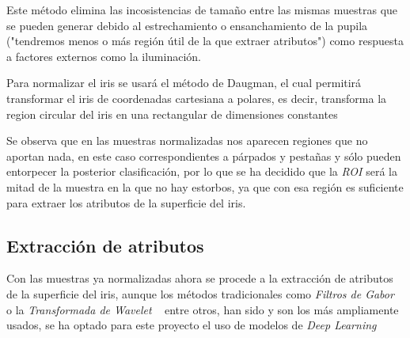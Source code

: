 Este método elimina las incosistencias de tamaño entre las mismas muestras que se pueden generar debido al estrechamiento o ensanchamiento de la pupila ("tendremos menos o más región útil de la que extraer atributos") como respuesta a factores externos como la iluminación.

Para normalizar el iris se usará el método de Daugman, el cual permitirá transformar el iris de coordenadas cartesiana a polares, es decir, transforma la region circular del iris en una rectangular de dimensiones constantes ~\cite{terissi:2000}


Se observa que en las muestras normalizadas nos aparecen regiones que no aportan nada, en este caso correspondientes a párpados y pestañas y sólo pueden entorpecer la posterior clasificación, por lo que se ha decidido que la \emph{ROI} será la mitad de la muestra en la que no hay estorbos, ya que con esa región es suficiente para extraer los atributos de la superficie del iris.

\subsection{Extracción de atributos}
Con las muestras ya normalizadas ahora se procede a la extracción de atributos de la superficie del iris, aunque los métodos tradicionales como \emph{Filtros de Gabor} ~\cite{gabor:1946} o la \emph{Transformada de Wavelet} ~\cite{abdullah:2015} entre otros, han sido y son los más ampliamente usados, se ha optado para este proyecto el uso de modelos de \emph{Deep Learning} ~\cite{alaslni:2019, waisy:2017,alvarg:2020}

